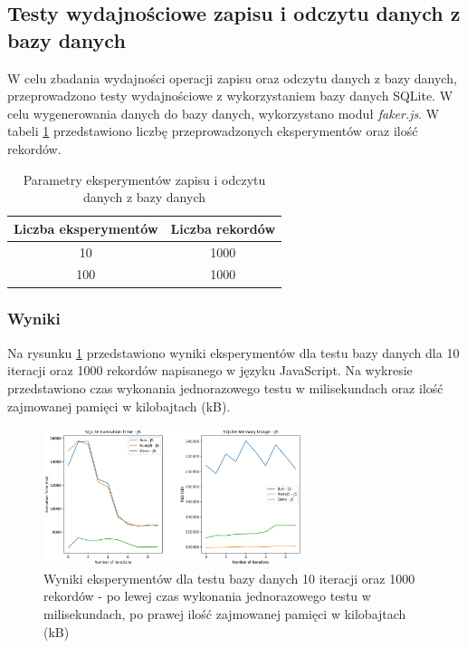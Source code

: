 \subsection{Testy wydajnościowe zapisu i odczytu danych z bazy danych}
W celu zbadania wydajności operacji zapisu oraz odczytu danych z bazy danych, przeprowadzono testy wydajnościowe z wykorzystaniem bazy danych SQLite. W celu wygenerowania danych do bazy danych, wykorzystano moduł \textit{faker.js}. W tabeli \ref{tab:database_experiments} przedstawiono liczbę przeprowadzonych eksperymentów oraz ilość rekordów.

\begin{table}[H]
  \centering
  \caption{Parametry eksperymentów zapisu i odczytu danych z bazy danych}
  \begin{tabular}{|c|c|}
    \hline
    \textbf{Liczba eksperymentów} & \textbf{Liczba rekordów}\\ \hline
    10 & 1000 \\ \hline
    100 & 1000 \\ \hline
  \end{tabular}
  \label{tab:database_experiments}
\end{table}

\subsubsection{Wyniki}
Na rysunku \ref{fig:database_e1_js} przedstawiono wyniki eksperymentów dla testu bazy danych dla 10 iteracji oraz 1000 rekordów napisanego w języku JavaScript. Na wykresie przedstawiono czas wykonania jednorazowego testu w milisekundach oraz ilość zajmowanej pamięci w kilobajtach (kB).

\begin{figure}[H]
  \centering
  \includegraphics[width=0.68\textwidth]{Figures/database/sqlite_10_1000_js.png}
  \caption{Wyniki eksperymentów dla testu bazy danych 10 iteracji oraz 1000 rekordów - po lewej czas wykonania jednorazowego testu w milisekundach, po prawej ilość zajmowanej pamięci w kilobajtach (kB)}
  \label{fig:database_e1_js}
\end{figure}

